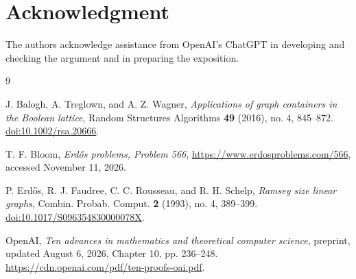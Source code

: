 \documentclass[11pt,leqno]{amsart}
\numberwithin{equation}{section}
\theoremstyle{definition}
\theoremstyle{remark}
\begin{document}
\section*{Acknowledgment}
The authors acknowledge assistance from OpenAI's ChatGPT in developing and checking the argument and in preparing the exposition.

\begin{thebibliography}{9}

J. Balogh, A. Treglown, and A. Z. Wagner,
\emph{Applications of graph containers in the Boolean lattice},
Random Structures Algorithms \textbf{49} (2016), no. 4, 845--872.
\href{https://doi.org/10.1002/rsa.20666}{doi:10.1002/rsa.20666}.

T. F. Bloom,
\emph{Erd\H{o}s problems, Problem 566},
\url{https://www.erdosproblems.com/566}, accessed November 11, 2026.

P. Erd\H{o}s, R. J. Faudree, C. C. Rousseau, and R. H. Schelp,
\emph{Ramsey size linear graphs},
Combin. Probab. Comput. \textbf{2} (1993), no. 4, 389--399.
\href{https://doi.org/10.1017/S096354830000078X}{doi:10.1017/S096354830000078X}.

OpenAI,
\emph{Ten advances in mathematics and theoretical computer science},
preprint, updated August 6, 2026, Chapter 10, pp. 236--248.
\url{https://cdn.openai.com/pdf/ten-proofs-oai.pdf}.

\end{thebibliography}
\end{document}
